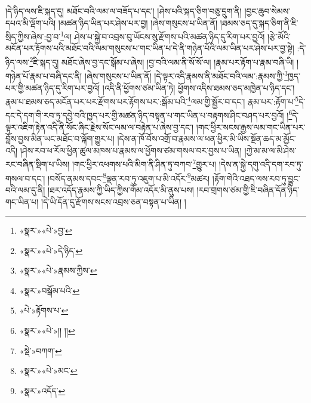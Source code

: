 །དེ་ཉིད་ལས་ཇི་སྐད་དུ། མཐོང་བའི་ལམ་ལ་བཟོད་པ་དང་། །ཤེས་པའི་སྐད་ཅིག་བཅུ་དྲུག་ནི། །བྱང་ཆུབ་སེམས་དཔའ་མི་ལྡོག་པའི། །མཚན་ཉིད་ཡིན་པར་ཤེས་པར་བྱ། །ཞེས་གསུངས་པ་ཡིན་ནོ། །ཐམས་ཅད་དུ་སྐད་ཅིག་ནི་ཇི་སྲིད་ཀྱིས་ཞེས་:བྱ་བ་\footnote{«སྣར་»«པེ་»བྱ་}ལ། ཤེས་པ་སྐྱེ་བ་འབྲས་བུ་ཡོངས་སུ་རྫོགས་པའི་མཚན་ཉིད་དུ་རིག་པར་བྱའོ། །རྩེ་མོའི་མངོན་པར་རྟོགས་པའི་མཐོང་བའི་ལམ་གསུངས་པ་གང་ཡིན་པ་དེ་ནི་གཉེན་པོའི་ལམ་ཡིན་པར་ཤེས་པར་བྱ་སྟེ། :དེ་ཉིད་ལས་\footnote{«སྣར་»«པེ་»དེ་ཉིད་}ཇི་སྐད་དུ། མཐོང་ཞེས་བྱ་དང་སྒོམ་པ་ཞེས། །བྱ་བའི་ལམ་ནི་སོ་སོ་ལ། །རྣམ་པར་རྟོག་པ་རྣམ་བཞི་ཡི། །གཉེན་པོ་རྣམ་པ་བཞི་དང་ནི། །ཞེས་གསུངས་པ་ཡིན་ནོ། །དེ་ལྟར་འདི་རྣམས་ནི་མཐོང་བའི་ལམ་:རྣམས་ཀྱི་\footnote{«སྣར་»«པེ་»རྣམས་ཀྱིས་}ཁྱད་པར་གྱི་མཚན་ཉིད་དུ་རིག་པར་བྱའོ། །འདི་ནི་ཕྱོགས་ཙམ་ཡིན་ཏེ། ཕྱོགས་འདིས་ཐམས་ཅད་མཁྱེན་པ་ཉིད་དང་། རྣམ་པ་ཐམས་ཅད་མངོན་པར་པར་རྫོགས་པར་རྟོགས་པར་:སྒོམ་པའི་\footnote{«སྣར་»བསྒོམ་པའི་}ལམ་གྱི་སྦྱོར་བ་དང་། རྣམ་པར་:རྟོག་པ་\footnote{«པེ་»རྟོགས་པ་}དེ་དང་དེ་དག་གི་རབ་ཏུ་དབྱེ་བའི་ཁྱད་པར་གྱི་མཚན་ཉིད་བསྟན་པ་གང་ཡིན་པ་བརྟགས་ཤིང་བཤད་པར་བྱའོ། །\footnote{«སྣར་»«པེ་»།། །།}དེ་ལྟར་འཇིག་རྟེན་འདི་ནི་སོང་ཞིང་རྗེས་སོང་ལམ་ལ་བརྟེན་པ་ཞེས་བྱ་དང་། །གང་ཕྱིར་སངས་རྒྱས་ལམ་གང་ཡིན་པར་བློས་བྱས་མིན་ཡང་མཐོང་བ་ལྐོག་གྱུར་པ། །དེས་ན་ཁོ་བོས་འགྲོ་བ་རྣམས་ལ་ཕན་ཕྱིར་མི་ཡིས་སྔོན་ཆད་མ་མྱོང་འདི། །ཤེས་རབ་ཕ་རོལ་ཕྱིན་ཚུལ་མཁས་པ་རྣམས་ལ་ཕྱོགས་ཙམ་གསལ་བར་བྱས་པ་ཡིན། །ཀྱེ་མ་མ་ལ་མི་ཤེས་རང་བཞིན་སྡིག་པ་ཡིས། །གང་ཕྱིར་འཕགས་པའི་མིག་ནི་ཤིན་ཏུ་བཀབ་\footnote{«སྡེ་»བཀག་}གྱུར་པ། །དེས་ན་སྐྱེ་དགུ་འདི་དག་རབ་ཏུ་གསལ་བ་དང་། །བསོད་ནམས་དབང་\footnote{«སྣར་»«པེ་»མང་}ལྡན་རབ་ཏུ་འཇུག་པ་མི་འདོར་\footnote{«སྣར་»འདོད་}མཚར། །རྟོག་གེའི་འཐད་ལས་རབ་ཏུ་བྱུང་བའི་ལམ་དུ་ནི། །ཐར་འདོད་རྣམས་ཀྱི་ཡིད་ཀྱིས་གོམ་འདོར་མི་ནུས་པས། །རབ་གྲགས་ཙམ་གྱི་ཇི་བཞིན་དོན་ཉིད་གང་ཡིན་པ། །དེ་ཡི་དོན་དུ་རྫོགས་སངས་འབྲས་ཅན་བསྟན་པ་ཡིན། །
